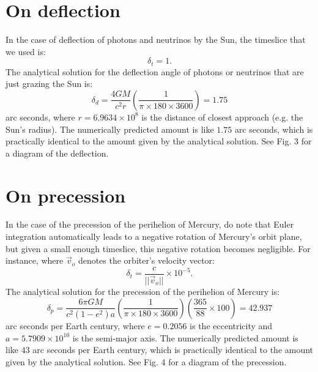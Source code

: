\documentclass[12pt]{article}
\begin{document}
\section{On deflection}

In the case of deflection of photons and neutrinos by the Sun, the timeslice that we used is:
\begin{equation}
\label{dt_1}
\delta_{t} = 1.
\end{equation}
The analytical solution for the deflection angle of photons or neutrinos that are just grazing the Sun is:
\begin{equation}
\label{delta_d}
\delta_{d} = \frac{4GM}{c^2 r} \left( \frac{1}{\pi \times 180 \times 3600} \right) = 1.75
\end{equation}
arc seconds, where $r = 6.9634 \times 10^8$ is the distance of closest approach (e.g. the Sun's radius).
The numerically predicted amount is like $1.75$ arc seconds, which is practically identical to the amount given by the analytical solution.
See Fig. 3 for a diagram of the deflection.






\section{On precession}


In the case of the precession of the perihelion of Mercury, do note that Euler integration automatically leads to a negative rotation of Mercury's orbit plane, but given a small enough timeslice, this negative rotation becomes negligible.
For instance, where $\vec{v}_{o}$ denotes the orbiter's velocity vector:
\begin{equation}
\label{dt_other}
\delta_{t} = \frac{c}{\lvert\lvert \vec{v}_{o} \rvert \rvert} \times 10^{-5}.
\end{equation}
The analytical solution for the precession of the perihelion of Mercury is:
\begin{equation}
\label{delta_p}
\delta_{p} = \frac{6 \pi G M}{c^2 (1 - e^2) a} \left( \frac{1}{ \pi \times 180 \times 3600} \right) \left( \frac{365}{88} \times 100 \right) = 42.937
\end{equation}
arc seconds per Earth century, where $e = 0.2056$ is the eccentricity and $a = 5.7909 \times 10^{10}$ is the semi-major axis.
The numerically predicted amount is like $43$ arc seconds per Earth century, which is practically identical to the amount given by the analytical solution.
See Fig. 4 for a diagram of the precession.
\end{document}
